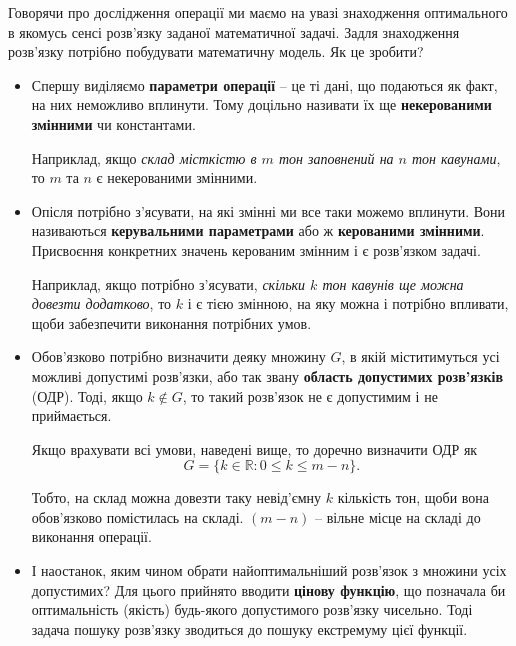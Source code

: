 \documentclass[../book.tex]{subfiles}
\begin{document}

Говорячи про \flqq{}дослідження операції\frqq{} ми маємо на увазі знаходження оптимального в якомусь сенсі розв'язку заданої математичної задачі. Задля знаходження розв'язку потрібно побудувати математичну модель. Як це зробити?

\begin{itemize}

 \item
 
 Спершу виділяємо \textbf{параметри операції} -- це ті дані, що подаються як факт, на них неможливо вплинути. Тому доцільно називати їх ще \textbf{некерованими змінними} чи константами.
 
 Наприклад, якщо \textit{склад місткістю в $m$ тон заповнений на $n$ тон кавунами}, то $m$ та $n$ є некерованими змінними.

 \item
 
 Опісля потрібно з'ясувати, на які змінні ми все таки можемо вплинути. Вони називаються \textbf{керувальними параметрами} або ж \textbf{керованими змінними}. Присвоєння конкретних значень керованим змінним і є розв'язком задачі.
 
 Наприклад, якщо потрібно з'ясувати, \textit{скільки $k$ тон кавунів ще можна довезти додатково}, то $k$ і є тією змінною, на яку можна і потрібно впливати, щоби забезпечити виконання потрібних умов.
 
 \item
 
 Обов'язково потрібно визначити деяку множину $G$, в якій міститимуться усі можливі допустимі розв'язки, або так звану \textbf{область допустимих розв'язків} (ОДР). Тоді, якщо $k \notin G$, то такий розв'язок не є допустимим і не приймається.
 
 Якщо врахувати всі умови, наведені вище, то доречно визначити ОДР як $$ G = \{{k \in \mathbb{R}}:  {0 \leq k \leq m-n}\}. $$

 Тобто, на склад можна довезти таку невід'ємну $k$ кількість тон, щоби вона обов'язково помістилась на складі. $(m-n)$ -- вільне місце на складі до виконання операції.

 \item
 
 І наостанок, яким чином обрати найоптимальніший розв'язок з множини усіх допустимих? Для цього прийнято вводити \textbf{цінову функцію}, що позначала би оптимальність (якість) будь-якого допустимого розв'язку чисельно. Тоді задача пошуку розв'язку зводиться до пошуку екстремуму цієї функції.
 

\end{itemize}
\end{document}
